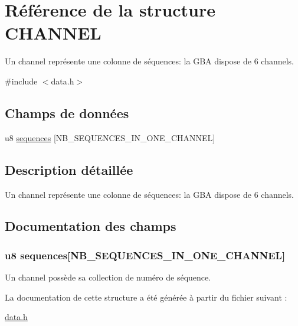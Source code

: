 \hypertarget{struct_c_h_a_n_n_e_l}{
\section{Référence de la structure CHANNEL}
\label{struct_c_h_a_n_n_e_l}
}


Un channel représente une colonne de séquences: la GBA dispose de 6 channels.  




{\ttfamily \#include $<$data.h$>$}

\subsection*{Champs de données}
\begin{DoxyCompactItemize}
\item 
u8 \hyperlink{struct_c_h_a_n_n_e_l_aa5f01c6f8df8a2e89e6896d79ddd9446}{sequences} \mbox{[}NB\_\-SEQUENCES\_\-IN\_\-ONE\_\-CHANNEL\mbox{]}
\end{DoxyCompactItemize}


\subsection{Description détaillée}
Un channel représente une colonne de séquences: la GBA dispose de 6 channels. 

\subsection{Documentation des champs}
\hypertarget{struct_c_h_a_n_n_e_l_aa5f01c6f8df8a2e89e6896d79ddd9446}{
\subsubsection[{sequences}]{\setlength{\rightskip}{0pt plus 5cm}u8 {\bf sequences}\mbox{[}NB\_\-SEQUENCES\_\-IN\_\-ONE\_\-CHANNEL\mbox{]}}}
\label{struct_c_h_a_n_n_e_l_aa5f01c6f8df8a2e89e6896d79ddd9446}
Un channel possède sa collection de numéro de séquence. 

La documentation de cette structure a été générée à partir du fichier suivant :\begin{DoxyCompactItemize}
\item 
\hyperlink{data_8h}{data.h}\end{DoxyCompactItemize}

